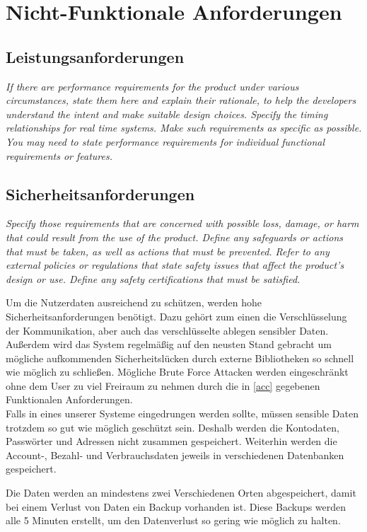 \section{Nicht-Funktionale Anforderungen}

\subsection{Leistungsanforderungen}
\textit{If there are performance requirements for the product under various 
circumstances, state them here and explain their rationale, 
to help the developers understand the intent and make suitable design choices. 
Specify the timing relationships for real time systems. 
Make such requirements as specific as possible. 
You may need to state performance requirements 
for individual functional requirements or features.}


\subsection{Sicherheitsanforderungen}
\textit{Specify those requirements that are concerned 
with possible loss, damage, or harm that could result from the use of the product. 
Define any safeguards or actions that must be taken, as well as actions that must be prevented. 
Refer to any external policies or regulations that state safety issues that affect the product’s design or use. 
Define any safety certifications that must be satisfied.}

Um die Nutzerdaten ausreichend zu schützen, werden hohe Sicherheitsanforderungen benötigt. Dazu gehört zum einen die Verschlüsselung der Kommunikation, aber auch das verschlüsselte ablegen sensibler Daten. Außerdem wird das System regelmäßig auf den neusten Stand gebracht um mögliche aufkommenden Sicherheitslücken durch externe Bibliotheken so schnell wie möglich zu schließen. Mögliche Brute Force Attacken werden eingeschränkt ohne dem User zu viel Freiraum zu nehmen durch die in \ref{acc} gegebenen Funktionalen Anforderungen.\\
Falls in eines unserer Systeme eingedrungen werden sollte, müssen sensible Daten trotzdem so gut wie möglich geschützt sein. Deshalb werden die Kontodaten, Passwörter und Adressen nicht zusammen gespeichert.
Weiterhin werden die Account-, Bezahl- und Verbrauchsdaten jeweils in verschiedenen Datenbanken gespeichert.

Die Daten werden an mindestens zwei Verschiedenen Orten 
abgespeichert, damit bei einem Verlust von Daten %
ein Backup vorhanden ist.
Diese Backups werden alle 5 Minuten erstellt, um den Datenverlust so gering wie möglich zu halten. %




